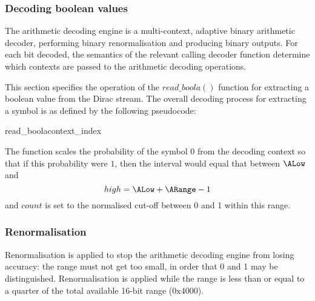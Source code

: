 \subsubsection{Decoding boolean values}
\label{arithreadbool}

The arithmetic decoding engine is a multi-context, adaptive binary
arithmetic decoder, performing binary renormalisation and producing
binary outputs. For each bit decoded, the semantics of the relevant
calling decoder function determine which contexts are passed to the
arithmetic decoding operations. 

This section specifies the operation of the $read\_boola()$ function
for extracting a boolean value from the Dirac stream. The overall decoding
process for extracting a symbol is as defined by the following
pseudocode:

\begin{pseudo}{read\_boola}{context\_index}
\bsELSE
\bsEND
{}
\bsEND
{}
\end{pseudo}

\begin{informative}
The function scales the probability of the symbol $0$ from the decoding context
so that if this probability were $1$, then the interval would equal that between
 $\ALow$ and 
 \[high=\ALow+\ARange-1\]
and $count$ is set to the normalised cut-off between 0 and 1 within this range.
\end{informative}

\subsubsection{Renormalisation}
\label{renormalisation}

Renormalisation is applied to stop the arithmetic decoding 
engine from losing accuracy: the range must not get too small,
 in order that 0 and 1 may be distinguished. Renormalisation is
 applied while the range is less than or equal to a quarter of 
 the total available 16-bit range ($\text{0x4000}$). 

